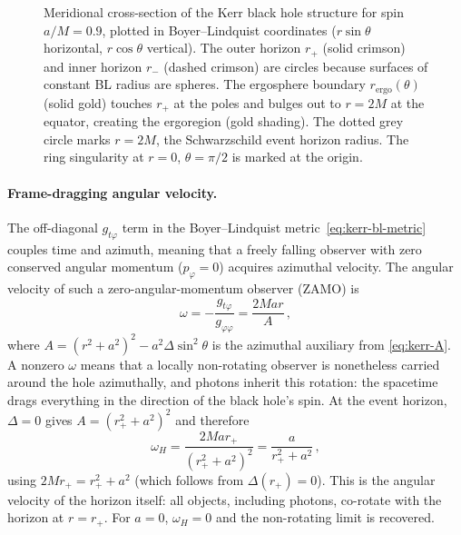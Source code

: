 \begin{figure}[htbp]
  \centering
  
  \caption[Kerr horizons and ergosphere]{%
    Meridional cross-section of the Kerr black hole structure for spin
    $a/M = 0.9$, plotted in Boyer--Lindquist coordinates
    ($r\sin\theta$ horizontal, $r\cos\theta$ vertical).  The outer
    horizon $r_+$ (solid crimson) and inner horizon $r_-$ (dashed
    crimson) are circles because surfaces of constant BL radius are
    spheres.  The ergosphere boundary $r_{\text{ergo}}(\theta)$ (solid
    gold) touches $r_+$ at the poles and bulges out to $r = 2M$ at the
    equator, creating the ergoregion (gold shading).  The dotted grey
    circle marks $r = 2M$, the Schwarzschild event horizon radius.
    The ring singularity at $r = 0$, $\theta = \pi/2$ is marked at
    the origin.}
  \label{fig:kerr-horizons-ergosphere}
\end{figure}

\paragraph{Frame-dragging angular velocity.}

The off-diagonal $g_{t\varphi}$ term in the Boyer--Lindquist
metric~\cref{eq:kerr-bl-metric} couples time and azimuth, meaning
that a freely falling observer with zero conserved angular momentum
($p_\varphi = 0$) acquires azimuthal velocity.  The angular
velocity of such a zero-angular-momentum observer (ZAMO) is
%
\begin{equation}
  \omega = -\frac{g_{t\varphi}}{g_{\varphi\varphi}}
         = \frac{2Mar}{A} \,,
  \label{eq:kerr-omega}
\end{equation}
%
where $A = (r^2 + a^2)^2 - a^2\Delta\sin^2\!\theta$ is the
azimuthal auxiliary from \cref{eq:kerr-A}.  A nonzero $\omega$
means that a locally non-rotating observer is nonetheless carried
around the hole azimuthally, and photons inherit this rotation: the
spacetime drags everything in the direction of the black hole's
spin.  At the event horizon, $\Delta = 0$ gives
$A = (r_+^2 + a^2)^2$ and therefore
%
\begin{equation}
  \omega_H = \frac{2Mar_+}{(r_+^2 + a^2)^2}
           = \frac{a}{r_+^2 + a^2} \,,
  \label{eq:kerr-omega-horizon}
\end{equation}
%
using $2Mr_+ = r_+^2 + a^2$ (which follows from
$\Delta(r_+) = 0$).  This is the angular velocity of the
horizon itself: all objects, including photons, co-rotate
with the horizon at $r = r_+$.  For $a = 0$, $\omega_H = 0$
and the non-rotating limit is recovered.

